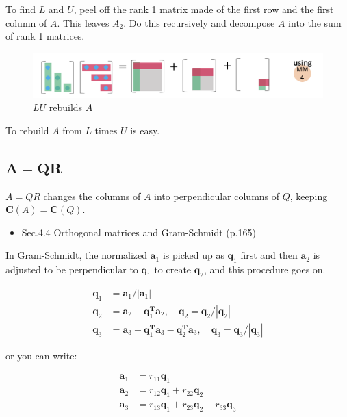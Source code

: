 \documentclass[letterpaper]{article}
\begin{document}
To find $L$ and $U$, peel off the rank 1 matrix made of
the first row and the first column of $A$.
This leaves $A_2$. Do this recursively and decompose $A$ into the sum of rank 1 matrices.


\begin{figure}[H]
  \includegraphics[keepaspectratio, width=\linewidth]{LU2.png}
\caption{$LU$ rebuilds $A$}
\end{figure}

To rebuild $A$ from $L$ times $U$ is easy.

\clearpage

\subsection{$\boldsymbol{A=QR}$}

$A=QR$ changes the columns of $A$ into perpendicular columns of $Q$, keeping $\bm{C}(A) = \bm{C}(Q)$.

\begin{itemize}
  \item Sec.4.4 Orthogonal matrices and Gram-Schmidt (p.165)
\end{itemize}

In Gram-Schmidt, the normalized $\bm{a}_1$ is picked up as $\bm{q}_1$ first and then
$\bm{a}_2$ is adjusted to be perpendicular to $\bm{q}_1$ to create $\bm{q}_2$, and this
procedure goes on.

\begin{align*}
  \bm{q}_1 &= \bm{a}_1/|\bm{a}_1| \\
  \bm{q}_2 &= \bm{a}_2 - \bm{q}_1^\mathbf{T} \bm{a}_2, \quad \bm{q}_2 = \bm{q}_2/|\bm{q}_2| \\
  \bm{q}_3 &= \bm{a}_3 - \bm{q}_1^\mathbf{T} \bm{a}_3 - \bm{q}_2^\mathbf{T} \bm{a}_3, \quad \bm{q}_3 = \bm{q}_3/|\bm{q}_3|
\end{align*}

or you can write:

\begin{align*}
  \bm{a}_1 &= r_{11}\bm{q}_1\\
  \bm{a}_2 &= r_{12}\bm{q}_1 + r_{22} \bm{q}_2\\
  \bm{a}_3 &= r_{13}\bm{q}_1 + r_{23} \bm{q}_2 + r_{33} \bm{q}_3
\end{align*}
\end{document}
